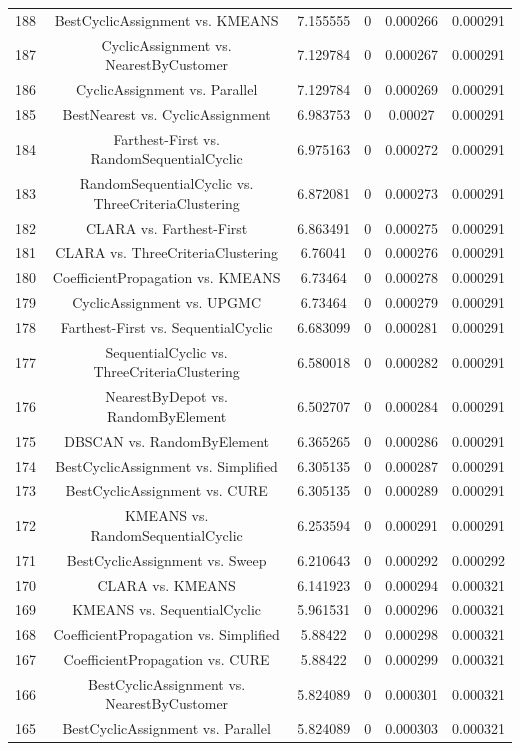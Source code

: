 \documentclass[a4paper,10pt]{article}
\begin{document}
\begin{landscape}
\begin{table}[!htp]
\begin{tabular}{cccccc}
188&BestCyclicAssignment vs. KMEANS&7.155555&0&0.000266&0.000291\\
187&CyclicAssignment vs. NearestByCustomer&7.129784&0&0.000267&0.000291\\
186&CyclicAssignment vs. Parallel&7.129784&0&0.000269&0.000291\\
185&BestNearest vs. CyclicAssignment&6.983753&0&0.00027&0.000291\\
184&Farthest-First vs. RandomSequentialCyclic&6.975163&0&0.000272&0.000291\\
183&RandomSequentialCyclic vs. ThreeCriteriaClustering&6.872081&0&0.000273&0.000291\\
182&CLARA vs. Farthest-First&6.863491&0&0.000275&0.000291\\
181&CLARA vs. ThreeCriteriaClustering&6.76041&0&0.000276&0.000291\\
180&CoefficientPropagation vs. KMEANS&6.73464&0&0.000278&0.000291\\
179&CyclicAssignment vs. UPGMC&6.73464&0&0.000279&0.000291\\
178&Farthest-First vs. SequentialCyclic&6.683099&0&0.000281&0.000291\\
177&SequentialCyclic vs. ThreeCriteriaClustering&6.580018&0&0.000282&0.000291\\
176&NearestByDepot vs. RandomByElement&6.502707&0&0.000284&0.000291\\
175&DBSCAN vs. RandomByElement&6.365265&0&0.000286&0.000291\\
174&BestCyclicAssignment vs. Simplified&6.305135&0&0.000287&0.000291\\
173&BestCyclicAssignment vs. CURE&6.305135&0&0.000289&0.000291\\
172&KMEANS vs. RandomSequentialCyclic&6.253594&0&0.000291&0.000291\\
171&BestCyclicAssignment vs. Sweep&6.210643&0&0.000292&0.000292\\
170&CLARA vs. KMEANS&6.141923&0&0.000294&0.000321\\
169&KMEANS vs. SequentialCyclic&5.961531&0&0.000296&0.000321\\
168&CoefficientPropagation vs. Simplified&5.88422&0&0.000298&0.000321\\
167&CoefficientPropagation vs. CURE&5.88422&0&0.000299&0.000321\\
166&BestCyclicAssignment vs. NearestByCustomer&5.824089&0&0.000301&0.000321\\
165&BestCyclicAssignment vs. Parallel&5.824089&0&0.000303&0.000321\\

\end{tabular}
\end{table}
\end{landscape}
\end{document}
